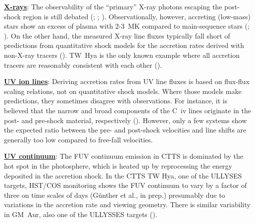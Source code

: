 \documentclass[letterpaper,11pt,twocolumn]{article}
\begin{document}
\underline{\bf X-rays}: The observability of the ``primary'' X-ray photons 
escaping the post-shock region is still debated 
(; ; ). Observationally, 
however, accreting (low-mass) stars show  an excess of plasma with 2-3~MK
compared to main-sequence stars (; ).
On the other hand, the measured X-ray line fluxes typically fall short of
predictions from quantitative shock models for the accretion rates derived with non-X-ray tracers (). TW~Hya is the only known example where all accretion tracers are reasonably consistent with each other (). 


\underline{\bf UV ion lines}:  Deriving  accretion rates from UV line fluxes is based 
on flux-flux scaling relations, not on quantitative shock models. Where those models make predictions, they sometimes disagree with observations. For instance, it is believed that the  narrow and 
broad components of the C~{\sc iv} lines  originate in the post- and 
pre-shock material, respectively (). However, only a few systems show the
expected ratio between the pre- and post-shock velocities and line
shifts are generally too low compared to free-fall velocities. 

\underline{\bf UV continuum}: The FUV continuum emission in CTTS is dominated by the hot spot in the photosphere, which is heated up by reprocessing the energy deposited in the accretion shock. In the CTTS TW Hya, one of the ULLYSES targets, HST/COS monitoring shows the FUV continuum to vary by a factor of three on time scales of days (G\"unther et al., in prep.) presumably due to variations in the accretion rate and viewing geometry. There is similar variability in GM~Aur, also one of the ULLYSSES targets ().

\end{document}
